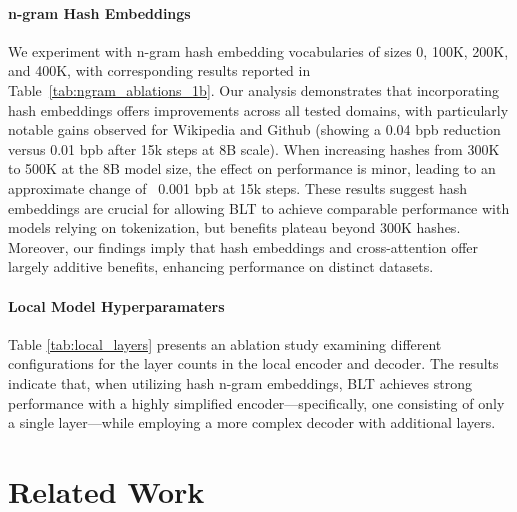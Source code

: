 \paragraph{n-gram Hash Embeddings} 

We experiment with n-gram hash embedding vocabularies of sizes 0, 100K, 200K, and 400K, with corresponding results reported in Table~\ref{tab:ngram_ablations_1b}. Our analysis demonstrates that incorporating hash embeddings offers improvements across all tested domains, with particularly notable gains observed for Wikipedia and Github (showing a 0.04 bpb reduction versus 0.01 bpb after 15k steps at 8B scale). When increasing hashes from 300K to 500K at the 8B model size, the effect on performance is minor, leading to an approximate change of ~0.001 bpb at 15k steps. These results suggest hash embeddings are crucial for allowing {\textsc BLT} to achieve comparable performance with models relying on tokenization, but benefits plateau beyond 300K hashes. Moreover, our findings imply that hash embeddings and cross-attention offer largely additive benefits, enhancing performance on distinct datasets.

\paragraph{Local Model Hyperparamaters} Table \ref{tab:local_layers} presents an ablation study examining different configurations for the layer counts in the local encoder and decoder. The results indicate that, when utilizing hash n-gram embeddings, {\textsc BLT} achieves strong performance with a highly simplified encoder—specifically, one consisting of only a single layer—while employing a more complex decoder with additional layers.

\section{Related Work}
\label{section:related_work}

